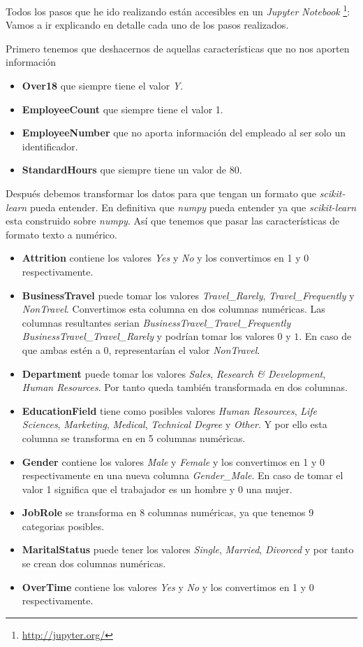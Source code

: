 Todos los pasos que he ido realizando están accesibles en un \textit{Jupyter Notebook} \footnote{\url{http://jupyter.org/}}:
Vamos a ir explicando en detalle cada uno de los pasos realizados.



Primero tenemos que deshacernos de aquellas características que no nos aporten información
\begin{itemize}
	\item \textbf{Over18} que siempre tiene el valor \textit{Y}.
	\item \textbf{EmployeeCount} que siempre tiene el valor 1.
	\item \textbf{EmployeeNumber} que no aporta información del empleado al ser solo un identificador.
	\item \textbf{StandardHours} que siempre tiene un valor de 80.
\end{itemize}

Después debemos transformar los datos para que tengan un formato que \textit{scikit-learn} pueda entender. En definitiva que \textit{numpy} pueda entender ya que \textit{scikit-learn} esta construido sobre \textit{numpy}.
Así que tenemos que pasar las características de formato texto a numérico.

\begin{itemize}
	\item \textbf{Attrition} contiene los valores \textit{Yes} y \textit{No} y los convertimos en 1 y 0 respectivamente.
	\item \textbf{BusinessTravel} puede tomar los valores \textit{Travel\_Rarely}, \textit{Travel\_Frequently} y \textit{Non\-Travel}. 
	Convertimos esta columna en dos columnas numéricas.
	Las columnas resultantes serian \textit{BusinessTravel\_Travel\_Frequently} \textit{BusinessTravel\_Travel\_Rarely} y podrían tomar los valores $0$ y $1$.
	En caso de que ambas estén a $0$, representarían el valor \textit{Non\-Travel}.
	\item \textbf{Department} puede tomar los valores \textit{Sales}, \textit{Research \& Development}, \textit{Human Resources}. 
	Por tanto queda también transformada en dos columnas.
	\item \textbf{EducationField} tiene como posibles valores \textit{Human Resources}, \textit{Life Sciences}, \textit{Marketing}, \textit{Medical}, \textit{Technical Degree} y \textit{Other}. 
	Y por ello esta columna se transforma en en 5 columnas numéricas. 
	\item \textbf{Gender} contiene los valores \textit{Male} y \textit{Female} y los convertimos en 1 y 0 respectivamente en una nueva columna \textit{Gender\_Male}.
	En caso de tomar el valor 1 significa que el trabajador es un hombre y 0 una mujer.
	\item \textbf{JobRole} se transforma en 8 columnas numéricas, ya que tenemos 9 categorias posibles.
	\item \textbf{MaritalStatus} puede tener los valores \textit{Single}, \textit{Married}, \textit{Divorced} y por tanto se crean dos columnas numéricas.
	\item \textbf{OverTime} contiene los valores \textit{Yes} y \textit{No} y los convertimos en 1 y 0 respectivamente.
\end{itemize}

